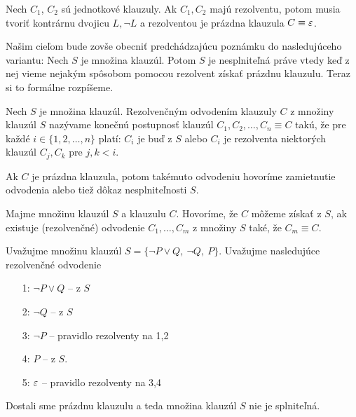 \begin{poznamka}
    Nech $C_1$, $C_2$ sú jednotkové klauzuly. Ak $C_1,C_2$ majú
    rezolventu, potom musia tvoriť kontrárnu dvojicu $L, \neg L$
    a rezolventou je prázdna klauzula $C \equiv \varepsilon$.
\end{poznamka}

Našim cieľom bude zovše obecniť predchádzajúcu poznámku do
nasledujúceho variantu: Nech $S$ je množina klauzúl. Potom $S$ je
nesplniteľná práve vtedy keď z nej vieme nejakým spôsobom pomocou
rezolvent získať prázdnu klauzulu.
Teraz si to formálne rozpíšeme.

\begin{definicia}
    Nech $S$ je množina klauzúl.
    Rezolvenčným odvodením klauzuly $C$ z množiny klauzúl $S$
    nazývame konečnú postupnosť klauzúl $C_1, C_2, \ldots, C_n \equiv C$ takú,
    že pre každé $i \in \{1,2,\dots,n\}$ platí:
    $C_i$ je buď z $S$ alebo $C_i$ je rezolventa niektorých klauzúl
    $C_j, C_k$ pre $j, k < i$.

    Ak $C$ je prázdna klauzula, potom takémuto odvodeniu hovoríme 
    zamietnutie odvodenia alebo tiež dôkaz nesplniteľnosti $S$.
\end{definicia}

\begin{definicia}
    Majme množinu klauzúl $S$ a klauzulu $C$.
    Hovoríme, že $C$ môžeme získať z $S$,
    ak existuje (rezolvenčné) odvodenie $C_1, \dots, C_m$ z množiny $S$ také, že
    $C_m \equiv C$.
\end{definicia}

\begin{priklad}
    Uvažujme množinu klauzúl $S=\{\neg P \lor Q,\ \neg Q,\ P\}$.
    Uvažujme nasledujúce rezolvenčné odvodenie
    \begin{itemize} 
	\item[1:] $ \neg P \lor Q $  -- z $S$
	\item[2:] $ \neg Q $ -- z $S$
	\item[3:] $ \neg P $ -- pravidlo rezolventy na 1,2
	\item[4:] $ P $ -- z $S$.
        \item[5:] $\varepsilon$ -- pravidlo rezolventy na 3,4
    \end{itemize}
    Dostali sme prázdnu klauzulu a teda množina klauzúl $S$ nie je
    splniteľná.
\end{priklad}

